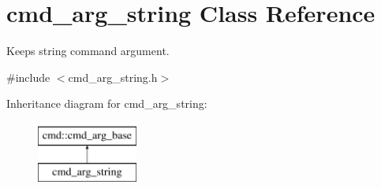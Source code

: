 \hypertarget{classcmd__arg__string}{\section{cmd\-\_\-arg\-\_\-string Class Reference}
\label{classcmd__arg__string}
}


Keeps string command argument.  




{\ttfamily \#include $<$cmd\-\_\-arg\-\_\-string.\-h$>$}

Inheritance diagram for cmd\-\_\-arg\-\_\-string\-:\begin{figure}[H]
\begin{center}
\leavevmode
\includegraphics[height=2.000000cm]{classcmd__arg__string}
\end{center}
\end{figure}
